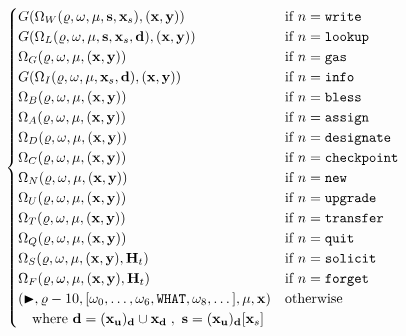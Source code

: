 \begin{align}
\begin{cases}
    G(\Omega_W(\gascounter, \registers, \memory, \mathbf{s}, \mathbf{x}_s), (\mathbf{x}, \mathbf{y})) &\when n = \mathtt{write} \\
    G(\Omega_L(\gascounter, \registers, \memory, \mathbf{s}, \mathbf{x}_s, \mathbf{d}), (\mathbf{x}, \mathbf{y})) &\when n = \mathtt{lookup} \\
    \Omega_G(\gascounter, \registers, \memory, (\mathbf{x}, \mathbf{y})) &\when n = \mathtt{gas} \\
    G(\Omega_I(\gascounter, \registers, \memory, \mathbf{x}_s, \mathbf{d}), (\mathbf{x}, \mathbf{y})) &\when n = \mathtt{info} \\
    \Omega_B(\gascounter, \registers, \memory, (\mathbf{x}, \mathbf{y})) &\when n = \mathtt{bless}\\
    \Omega_A(\gascounter, \registers, \memory, (\mathbf{x}, \mathbf{y})) &\when n = \mathtt{assign}\\
    \Omega_D(\gascounter, \registers, \memory, (\mathbf{x}, \mathbf{y})) &\when n = \mathtt{designate}\\
    \Omega_C(\gascounter, \registers, \memory, (\mathbf{x}, \mathbf{y})) &\when n = \mathtt{checkpoint} \\
    \Omega_N(\gascounter, \registers, \memory, (\mathbf{x}, \mathbf{y})) &\when n = \mathtt{new} \\
    \Omega_U(\gascounter, \registers, \memory, (\mathbf{x}, \mathbf{y})) &\when n = \mathtt{upgrade} \\
    \Omega_T(\gascounter, \registers, \memory, (\mathbf{x}, \mathbf{y})) &\when n = \mathtt{transfer} \\
    \Omega_Q(\gascounter, \registers, \memory, (\mathbf{x}, \mathbf{y})) &\when n = \mathtt{quit} \\
    \Omega_S(\gascounter, \registers, \memory, (\mathbf{x}, \mathbf{y}), \mathbf{H}_t) &\when n = \mathtt{solicit} \\
    \Omega_F(\gascounter, \registers, \memory, (\mathbf{x}, \mathbf{y}), \mathbf{H}_t) &\when n = \mathtt{forget} \\
    (\continue, \gascounter - 10, [\registers_0, \dots, \registers_6, \mathtt{WHAT}, \registers_8, \dots], \memory, \mathbf{x}) &\otherwise\\
    \quad \where \mathbf{d} = (\mathbf{x}_\mathbf{u})_\mathbf{d}\cup\mathbf{x}_\mathbf{d}\;,\ \mathbf{s} = (\mathbf{x}_\mathbf{u})_\mathbf{d}[\mathbf{x}_s]\!\!\!\!\!\!\!\!\!\!\!\!\!\!\!\!\!& \\
  \end{cases} \\

\end{align}
